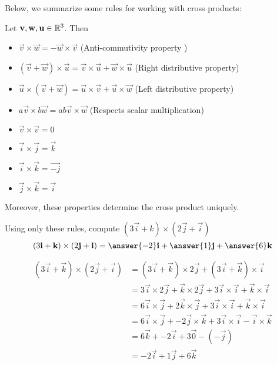 \documentclass{ximera}
\begin{document}
Below, we summarize some rules for working with cross products:

\begin{theorem}
  
  Let $\mathbf{v},\mathbf{w},\mathbf{u} \in \mathbb R^3$.  Then
  
  \begin{itemize}
  \item $\vec{v} \times \vec{w}  = -\vec{w} \times \vec{v}$ (Anti-commutivity property )
  \item $(\vec{v}+\vec{w}) \times \vec{u} = \vec{v} \times \vec{u}+\vec{w} \times \vec{u}$ (Right distributive property)
  \item $\vec{u} \times (\vec{v} +\vec{w}) = \vec{u} \times \vec{v}+\vec{u}\times\vec{w}$ (Left distributive property)
  \item $a\vec{v} \times b\vec{w} = ab \vec{v} \times \vec{w}$ (Respects scalar multiplication)
  \item $\vec{v} \times \vec{v} = 0$
  \item $\vec{i} \times \vec{j} = \vec{k}$
  \item $\vec{i} \times \vec{k} = \vec{-j}$
  \item $\vec{j} \times \vec{k} = \vec{i}$
  \end{itemize}
  
  Moreover, these properties determine the cross product uniquely.
\end{theorem}

\begin{question}
  Using only these rules, compute $(3\vec{i}+k) \times (2\vec{j}+\vec{i})$
  \[
  (3\vec{i}+\vec{k}) \times (2\vec{j}+\vec{i}) = \answer{-2}\vec{i}+\answer{1}\vec{j}+\answer{6}\vec{k}
  \]
  \begin{hint}
    \begin{align*}
      (3\vec{i}+\vec{k}) \times (2\vec{j}+\vec{i}) &= (3\vec{i}+\vec{k}) \times 2\vec{j}+(3\vec{i}+\vec{k}) \times\vec{i}\\
      &=3\vec{i} \times 2\vec{j}+\vec{k}\times 2\vec{j}+3\vec{i} \times \vec{i} +\vec{k} \times \vec{i}\\
      &=6 \vec{i} \times \vec{j}+2 \vec{k} \times \vec{j}+3\vec{i} \times \vec{i} +\vec{k} \times \vec{i}\\
      &=6 \vec{i} \times \vec{j}+-2 \vec{j} \times \vec{k}+3\vec{i} \times \vec{i} -\vec{i} \times \vec{k}\\
      &=6 \vec{k}+-2 \vec{i}+3\vec{0} -(-\vec{j})\\
      &=-2\vec{i}+1\vec{j}+6\vec{k}
    \end{align*}
  \end{hint}
\end{question}
\end{document}
